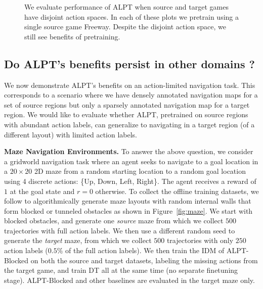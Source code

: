 \documentclass{article} %
\begin{document}
\begin{figure}

\caption{We evaluate performance of ALPT when source and target games have disjoint action spaces. In each of these plots we pretrain using a single source game Freeway. Despite the disjoint action space, we still see benefits of pretraining.}
\label{disres}
\end{figure}
\vspace{-0.5cm}
\subsection{Do ALPT's benefits persist in other domains ?}
We now demonstrate ALPT's benefits on an action-limited navigation task. This corresponds to a scenario where we have densely annotated navigation maps for a set of source regions but only a sparsely annotated navigation map for a target region. We would like to evaluate whether ALPT, pretrained on source regions with abundant action labels, can generalize to navigating in a target region (of a different layout) with limited action labels.

\textbf{Maze Navigation Environments.} %
To answer the above question, we consider a gridworld navigation task where an agent seeks to navigate to a goal location in a $20 \times 20$ 2D maze from a random starting location to a random goal location using 4 discrete actions: \{Up, Down, Left, Right\}. The agent receives a reward of $1$ at the goal state and $r=0$ otherwise. To collect the offline training datasets, we follow \citet{yang2022chain,zhang2018study} to algorithmically generate maze layouts with random internal walls that form blocked or tunneled obstacles as shown in Figure~\ref{fig:maze}. We start with blocked obstacles, and generate one \emph{source} maze from which we collect $500$ trajectories with full action labels. We then use a different random seed to generate the \emph{target} maze, from which we collect $500$ trajectories with only $250$ action labels ($0.5\%$ of the full action labels). We then train the IDM of ALPT-Blocked on both the source and target datasets, labeling the missing actions from the target game, and train DT all at the same time (no separate finetuning stage). ALPT-Blocked and other baselines are evaluated in the target maze only.
\end{document}
